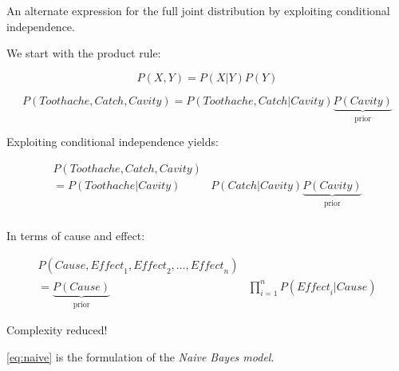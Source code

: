 \begin{frame}\frametitle{\subsecname}

An alternate expression for the full joint distribution by exploiting conditional independence.

We start with the product rule:

\begin{equation}
P(X,Y) = P(X|Y)P(Y)    
\end{equation}

\begin{equation}
P(\mathit{Toothache},\mathit{Catch},\mathit{Cavity}) = P(\mathit{Toothache},\mathit{Catch}|\mathit{Cavity}) \underbrace{P(\mathit{Cavity})}_{\text{prior}} 
\end{equation}

Exploiting conditional independence yields:

\begin{align}
P(\mathit{Toothache},\mathit{Catch},\mathit{Cavity}) &\\
= P(\mathit{Toothache}|\mathit{Cavity}) &P(\mathit{Catch}|\mathit{Cavity}) \underbrace{P(\mathit{Cavity})}_{\text{prior}} 
\end{align}

\end{frame}

\begin{frame}\frametitle{\subsecname}


In terms of cause and effect:

\begin{align}
P(\mathit{Cause}, \mathit{Effect}_1, \mathit{Effect}_2,\ldots, \mathit{Effect}_n) &\\
= \underbrace{P(\mathit{Cause})}_{\text{prior}} &\prod_{i=1}^{n} P(\mathit{Effect}_{i}|\mathit{Cause})
\label{eq:naive}
\end{align}

Complexity reduced!

\eqref{eq:naive} is the formulation of the \emph{Naive Bayes model}.

\end{frame}
